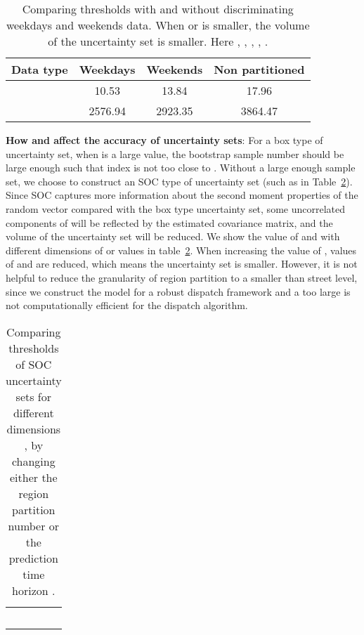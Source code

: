 \documentclass[10pt,twocolumn,twoside,english]{IEEEtran}
\begin{document}
\begin{table}[t!]
\centering
\begin{tabular}{|c|c|c|c|}
  \hline
Data type& Weekdays & Weekends &Non partitioned\\ \hline
 &10.53        &13.84          & 17.96   \\ \hline
  & 2576.94   &2923.35  &3864.47    \\ \hline
\end{tabular}
     \caption{Comparing thresholds with and without discriminating weekdays and weekends data. When  or  is smaller, the volume of the uncertainty set is smaller. Here , , , , .}
     \label{table_sepa}
  \vspace{-20pt}
\end{table}


\textbf{How  and  affect the accuracy of uncertainty sets}:
For a box type of uncertainty set, when  is a large value, the bootstrap sample number  should be large enough such that index  is not too close to . Without a large enough sample set, we choose to construct an SOC type of uncertainty set (such as  in Table~\ref{table_nt}). Since SOC captures more information about the second moment properties of the random vector compared with the box type uncertainty set, some uncorrelated components of  will be reflected by the estimated covariance matrix, and the volume of the uncertainty set will be reduced. We show the value of  and  with different dimensions of  or  values in table~\ref{table_nt}. When increasing the value of , values of  and  are reduced, which means the uncertainty set is smaller. However, it is not helpful to reduce the granularity of region partition to a smaller than street level, since we construct the model for a robust dispatch framework and a too large  is not computationally efficient for the dispatch algorithm.

\begin{table}[t!]
\centering
\begin{tabular}{|c|c|c|}
  \hline
                      &                      &  \\ \hline
                       &         & \\ \hline
                       &        &    \\ \hline
                       &      &    \\ \hline
                       &       &     \\ \hline
                   &        &    \\ \hline
\end{tabular}
     \caption{Comparing thresholds of SOC uncertainty sets for different dimensions , by changing either the region partition number  or the prediction time horizon .}\label{table_nt}
\vspace{-20pt}
\end{table}
\end{document}
